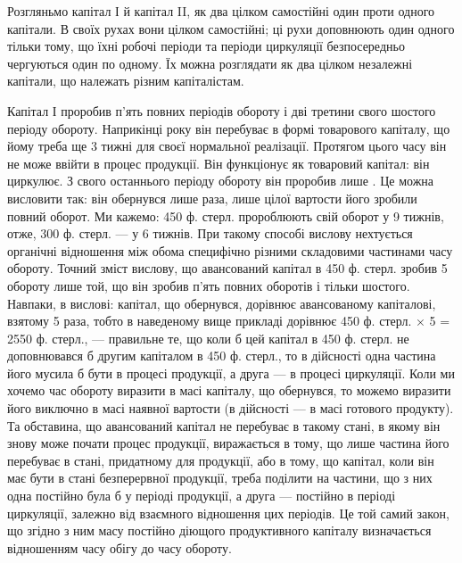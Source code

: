 Розгляньмо капітал І й капітал II, як два цілком самостійні один проти
одного капітали. В своїх рухах вони цілком самостійні; ці рухи доповнюють
один одного тільки тому, що їхні робочі періоди та періоди
циркуляції безпосередньо чергуються один по одному. Їх можна розглядати
як два цілком незалежні капітали, що належать різним капіталістам.

Капітал І проробив п’ять повних періодів обороту і дві третини свого
шостого періоду обороту. Наприкінці року він перебуває в формі товарового
капіталу, що йому треба ще 3 тижні для своєї нормальної реалізації.
Протягом цього часу він не може ввійти в процес продукції.
Він функціонує як товаровий капітал: він циркулює. З свого останнього
періоду обороту він проробив лише . Це можна висловити так: він
обернувся лише  раза, лише  цілої вартости його зробили повний оборот.
Ми кажемо: 450 ф. стерл. пророблюють свій оборот у 9 тижнів, отже,
300 ф. стерл. — у 6 тижнів. При такому способі вислову нехтується органічні
відношення між обома специфічно різними складовими частинами часу обороту.
Точний зміст вислову, що авансований капітал в 450 ф. стерл. зробив
5 обороту лише той, що він зробив п’ять повних оборотів і тільки
 шостого. Навпаки, в вислові: капітал, що обернувся, дорівнює
авансованому капіталові, взятому 5 раза, тобто в наведеному вище прикладі
дорівнює 450 ф. стерл. × 5 = 2550 ф. стерл., — правильне те, що
коли б цей капітал в 450 ф. стерл. не доповнювався б другим капіталом
в 450 ф. стерл., то в дійсності одна частина його мусила б бути в процесі
продукції, а друга — в процесі циркуляції. Коли ми хочемо час обороту
виразити в масі капіталу, що обернувся, то можемо виразити його
виключно в масі наявної вартости (в дійсності — в масі готового продукту).
Та обставина, що авансований капітал не перебуває в такому
стані, в якому він знову може почати процес продукції, виражається в
тому, що лише частина його перебуває в стані, придатному для продукції,
або в тому, що капітал, коли він має бути в стані безперервної продукції,
треба поділити на частини, що з них одна постійно була б у періоді
продукції, а друга — постійно в періоді циркуляції, залежно від взаємного
відношення цих періодів. Це той самий закон, що згідно з ним
масу постійно діющого продуктивного капіталу визначається відношенням
часу обігу до часу обороту.

